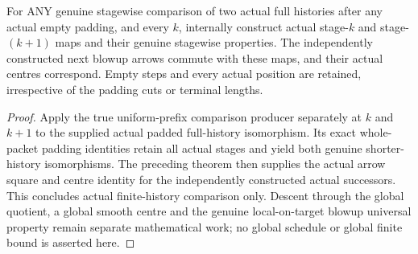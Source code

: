 \begin{theorem}
\label{hir:sharp-actual-curve-uniform-successor-padded-comparison}
\leanok
For ANY genuine stagewise comparison of two actual full histories after
any actual empty padding, and every $k$, internally construct actual
stage-$k$ and stage-$(k+1)$ maps and their genuine stagewise properties.
The independently constructed next blowup arrows commute with these maps,
and their actual centres correspond. Empty steps and every actual
position are retained, irrespective of the padding cuts or terminal lengths.
\end{theorem}
\begin{proof}
Apply the true uniform-prefix comparison producer separately at $k$ and
$k+1$ to the supplied actual padded full-history isomorphism. Its exact
whole-packet padding identities retain all actual stages and yield both
genuine shorter-history isomorphisms. The preceding theorem then supplies
the actual arrow square and centre identity for the independently
constructed actual successors. This concludes actual finite-history
comparison only. Descent through the global quotient, a global smooth
centre and the genuine local-on-target blowup universal property remain
separate mathematical work; no global schedule or global finite bound is
asserted here.
\end{proof}
